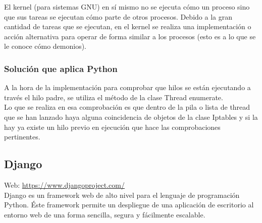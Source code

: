 El kernel (para sistemas GNU) en sí mismo no se ejecuta cómo un proceso sino que sus tareas se ejecutan cómo parte de otros procesos. Debido a la gran cantidad de tareas que se ejecutan, en el kernel se realiza una implementación o acción alternativa para operar de forma similar a los procesos (esto es a lo que se le conoce cómo demonios).\\

\subsubsection{Solución que aplica Python}

A la hora de la implementación para comprobar que hilos se están ejecutando a través el hilo padre, se utiliza el método de la clase Thread enumerate.\\

Lo que se realiza en esa comprobación es que dentro de la pila o lista de thread que se han lanzado haya alguna coincidencia de objetos de la clase Iptables y si la hay ya existe un hilo previo en ejecución que hace las comprobaciones pertinentes.\\


\newpage
\subsection{Django}


Web: \url{https://www.djangoproject.com/}\\

Django es un framework web de alto nivel para el lenguaje de programación Python. Éste framework permite un despliegue de una aplicación de escritorio al entorno web de una forma sencilla, segura y fácilmente escalable. \\

